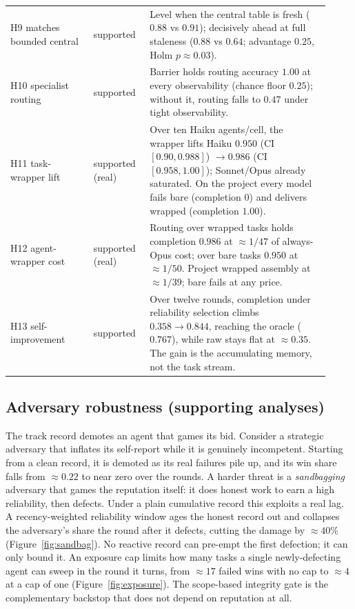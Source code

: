 \documentclass[11pt]{article}
\begin{document}
\begin{table}[t]
\begin{tabular}{@{}p{0.24\linewidth}p{0.16\linewidth}p{0.52\linewidth}@{}}
H9 matches bounded central & supported & Level when the central table is fresh ($0.88$ vs $0.91$); decisively ahead at full staleness ($0.88$ vs $0.64$; advantage $0.25$, Holm $p\approx0.03$). \\
H10 specialist routing & supported & Barrier holds routing accuracy $1.00$ at every observability (chance floor $0.25$); without it, routing falls to $0.47$ under tight observability. \\
H11 task-wrapper lift & supported (real) & Over ten Haiku agents/cell, the wrapper lifts Haiku $0.950$ (CI $[0.90,0.988]$) $\to0.986$ (CI $[0.958,1.00]$); Sonnet/Opus already saturated. On the project every model fails bare (completion $0$) and delivers wrapped (completion $1.00$). \\
H12 agent-wrapper cost & supported (real) & Routing over wrapped tasks holds completion $0.986$ at $\approx 1/47$ of always-Opus cost; over bare tasks $0.950$ at $\approx 1/50$. Project wrapped assembly at $\approx 1/39$; bare fails at any price. \\
H13 self-improvement & supported & Over twelve rounds, completion under reliability selection climbs $0.358\to0.844$, reaching the oracle ($0.767$), while raw stays flat at $\approx 0.35$. The gain is the accumulating memory, not the task stream. \\
\bottomrule
\end{tabular}
\end{table}

\subsection{Adversary robustness (supporting analyses)}
The track record demotes an agent that games its bid. Consider a strategic adversary that inflates its self-report while it is genuinely incompetent. Starting from a clean record, it is demoted as its real failures pile up, and its win share falls from $\approx 0.22$ to near zero over the rounds. A harder threat is a \emph{sandbagging} adversary that games the reputation itself: it does honest work to earn a high reliability, then defects. Under a plain cumulative record this exploits a real lag. A recency-weighted reliability window ages the honest record out and collapses the adversary's share the round after it defects, cutting the damage by $\approx 40\%$ (Figure~\ref{fig:sandbag}). No reactive record can pre-empt the first defection; it can only bound it. An exposure cap limits how many tasks a single newly-defecting agent can sweep in the round it turns, from $\approx 17$ failed wins with no cap to $\approx 4$ at a cap of one (Figure~\ref{fig:exposure}). The scope-based integrity gate is the complementary backstop that does not depend on reputation at all.
\end{document}
